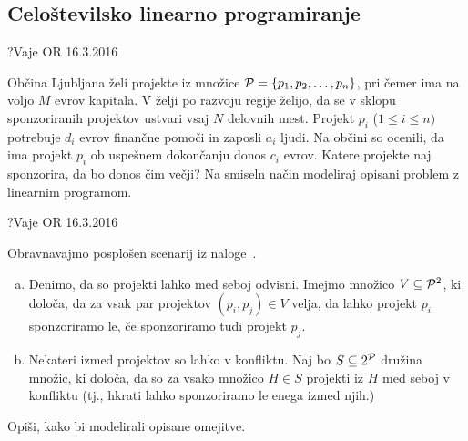 \subsection{Celoštevilsko linearno programiranje}

\begin{naloga}{?}{Vaje OR 16.3.2016}
\begin{vprasanje}[proj]
Občina Ljubljana želi projekte iz množice
$\mathcal{P} = \{p_1, p_2, \dots, p_n\}$,
pri čemer ima na voljo $M$ evrov kapitala.
V želji po razvoju regije želijo,
da se v sklopu sponzoriranih projektov ustvari vsaj $N$ delovnih mest.
Projekt $p_i$ ($1 \le i \le n)$ potrebuje $d_i$ evrov finančne pomoči
in zaposli $a_i$ ljudi.
Na občini so ocenili,
da ima projekt $p_i$ ob uspešnem dokončanju donos $c_i$ evrov.
Katere projekte naj sponzorira, da bo donos čim večji?
Na smiseln način modeliraj opisani problem z linearnim programom.
\end{vprasanje}
\begin{odgovor}
\end{odgovor}
\end{naloga}


\begin{naloga}{?}{Vaje OR 16.3.2016}
\begin{vprasanje}
Obravnavajmo posplošen scenarij iz naloge~.
\begin{enumerate}[(a)]
\item Denimo, da so projekti lahko med seboj odvisni.
Imejmo množico $V \subseteq \mathcal{P}^2$, ki določa,
da za vsak par projektov $(p_i, p_j) \in V$ velja,
da lahko projekt $p_i$ sponzoriramo le,
če sponzoriramo tudi projekt $p_j$.

\item Nekateri izmed projektov so lahko v konfliktu.
Naj bo $S \subseteq 2^{\mathcal{P}}$ družina množic, ki določa,
da so za vsako množico $H \in S$ projekti iz $H$ med seboj v konfliktu
(tj., hkrati lahko sponzoriramo le enega izmed njih.)
\end{enumerate}
Opiši, kako bi modelirali opisane omejitve.
\end{vprasanje}
\begin{odgovor}
\end{odgovor}
\end{naloga}


